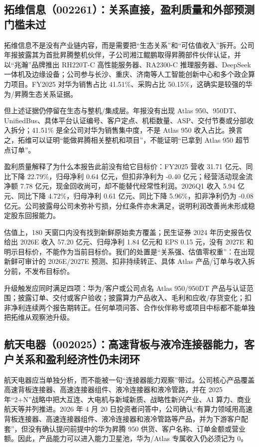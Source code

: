 \subsection{拓维信息（002261）：关系直接，盈利质量和外部预测门槛未过}

拓维信息不是没有产业链内容，而是需要把“生态关系”和“可估值收入”拆开。公司年报披露其为首批昇腾整机伙伴，子公司湘江鲲鹏取得昇腾部件伙伴认证，并以“兆瀚”品牌推出 RH220T-C 高性能服务器、RA2300-C 推理服务器、DeepSeek 一体机及边缘设备；公司参与长沙、重庆、济南等人工智能创新中心和多个政企算力项目。FY2025 对华为销售占比 41.51\%、采购占比 50.15\%，这确实是较强的华为/昇腾生态关系证据。

但上述证据仍停留在生态与整机/集成层。年报没有出现 Atlas 950、950DT、UnifiedBus、具体平台认证编号、客户定点、机柜数量、ASP、交付节奏或分部收入拆分；41.51\% 是全公司对华为销售集中度，不是 Atlas 950 收入占比。换言之，拓维可以证明“能做昇腾相关整机和项目”，不能证明“已拿到 Atlas 950 超节点订单”。

盈利质量解释了为什么本报告此前没有给它目标价：FY2025 营收 31.71 亿元、同比下降 22.79\%，归母净利 0.64 亿元，但扣非净利为 -0.40 亿元；经营活动现金流净额 7.78 亿元，现金回收尚可，却不能替代经常性利润。2026Q1 收入 5.94 亿元、同比下降 4.72\%，归母净利 0.61 亿元、同比下降 5.96\%，扣非净利仍为 -0.08 亿元。公司披露母公司未弥补亏损，分红条件亦未满足，说明利润改善尚未形成稳定股东回报能力。

估值上，180 天窗口内没有找到新鲜原始卖方覆盖；民生证券 2024 年历史报告仅给出 2026E 收入 57.20 亿元、归母净利 1.84 亿元和 EPS 0.15 元，没有 2027E 和明示目标价，不能作为当前目标价。我们的处置是“关系强、估值零权重”：在出现新鲜可审计的 2026E/2027E 预测、扣非持续转正、具体 Atlas 产品/订单与收入拆分前，不发布目标价。

升级触发应同时满足四项：华为/客户或公司点名 Atlas 950/950DT 产品与认证范围；披露订单、交付或客户验收；披露算力产品收入、毛利和应收/存货变化；扣非净利连续两个报告期转正。任何单项问答、合作伙伴称号或项目中标都不能单独把拓维从观察池升级。

\subsection{航天电器（002025）：高速背板与液冷连接器能力，客户关系和盈利经济性仍未闭环}

航天电器应当单独分析，而不能被一句“连接器能力观察”带过。公司核心产品覆盖高速背板连接器、高速连接器组件、液冷连接器和液冷管路，并在 2025 年“2+N”战略中把大互连、大电机与新域新质、战略性新兴产业、AI 算力、商业航天等并列推进。2026 年 4 月 20 日投资者问答中，公司确认“有算力领域用高速背板连接器、高速连接器组件、液冷连接器和液冷管路等产品，并为下游客户配套”，但没有确认提问前提中的华为昇腾 950 供货、客户名称、订单金额或营业额。因此，产品能力可以进入能力卫星池，华为/Atlas 专属收入仍必须记为 0。

